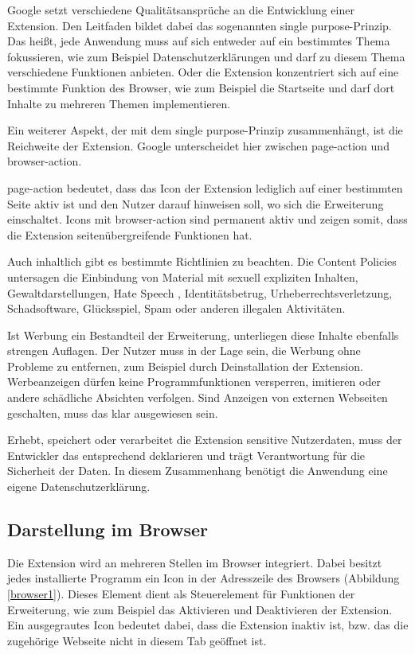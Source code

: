 Google setzt verschiedene Qualitätsansprüche an die Entwicklung einer Extension. Den Leitfaden bildet dabei das sogenannten \glqq single purpose\grqq{}-Prinzip\cite{single}. Das heißt, jede Anwendung muss auf sich entweder auf ein bestimmtes Thema fokussieren, wie zum Beispiel Datenschutzerklärungen und darf zu diesem Thema verschiedene Funktionen anbieten. Oder die Extension konzentriert sich auf eine bestimmte Funktion des Browser, wie zum Beispiel die Startseite und darf dort Inhalte zu mehreren Themen implementieren.

Ein weiterer Aspekt, der mit dem \glqq single purpose\grqq{}-Prinzip zusammenhängt, ist die Reichweite der Extension. Google unterscheidet hier zwischen \glqq page-action\grqq{} und \glqq browser-action\grqq{}.

\glqq page-action\grqq{} bedeutet, dass das Icon der Extension lediglich auf einer bestimmten Seite aktiv ist und den Nutzer darauf hinweisen soll, wo sich die Erweiterung einschaltet. Icons mit \glqq browser-action\grqq{} sind permanent aktiv und zeigen somit, dass die Extension seitenübergreifende Funktionen hat.

Auch inhaltlich gibt es bestimmte Richtlinien\cite{chrome} zu beachten. Die \glqq Content Policies \grqq{} untersagen die Einbindung von Material mit sexuell expliziten Inhalten, Gewaltdarstellungen, \glqq Hate Speech \grqq{}, Identitätsbetrug, Urheberrechtsverletzung, Schadsoftware, Glücksspiel, Spam oder anderen illegalen Aktivitäten.

Ist Werbung ein Bestandteil der Erweiterung, unterliegen diese Inhalte ebenfalls strengen Auflagen. Der Nutzer muss in der Lage sein, die Werbung ohne Probleme zu entfernen, zum Beispiel durch Deinstallation der Extension. Werbeanzeigen dürfen keine Programmfunktionen versperren, imitieren oder andere schädliche Absichten verfolgen. Sind Anzeigen von externen Webseiten geschalten, muss das klar ausgewiesen sein.

Erhebt, speichert oder verarbeitet die Extension sensitive Nutzerdaten, muss der Entwickler das entsprechend deklarieren und trägt Verantwortung für die Sicherheit der Daten. In diesem Zusammenhang benötigt die Anwendung eine eigene Datenschutzerklärung.
\subsection{Darstellung im Browser}
\label{ss:darstellung}

Die Extension wird an mehreren Stellen im Browser integriert. Dabei besitzt jedes installierte Programm ein Icon in der Adresszeile des Browsers (Abbildung \ref{browser1}). Dieses Element dient als Steuerelement für Funktionen der Erweiterung, wie zum Beispiel das Aktivieren und Deaktivieren der Extension. Ein ausgegrautes Icon bedeutet dabei, dass die Extension inaktiv ist, bzw. das die zugehörige Webseite nicht in diesem Tab geöffnet ist.

